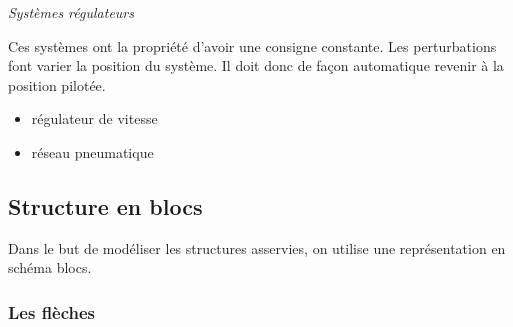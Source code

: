 \documentclass[11pt,oneside]{article}
\begin{document}
\begin{defi}
 \textit{\textsf{Systèmes régulateurs}}

Ces systèmes ont la propriété d'avoir une consigne constante. Les perturbations font varier la position du système. Il doit donc de façon automatique revenir à la position pilotée.
\end{defi}

\begin{exemple}
 \begin{itemize}
\item régulateur de vitesse
\item réseau pneumatique
\end{itemize}
\end{exemple}

\subsection{Structure en blocs}
Dans le but de modéliser les structures asservies, on utilise une représentation en schéma blocs.

\subsubsection*{Les flèches}
\end{document}
